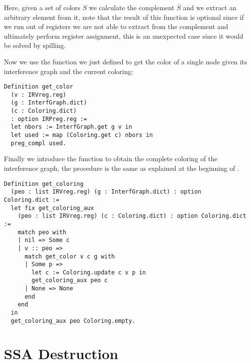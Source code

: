 Here, given a set of colors $S$ we calculate the complement $\bar S$ and we extract an arbitrary element from it, note that the result of this function is optional since if we run out of registers we are not able to extract from the complement and ultimately perform register assignment, this is an unexpected case since it would be solved by spilling.

Now we use the function we just defined to get the color of a single node given its interference graph and the current coloring:

\begin{lstlisting}[style=Coq]
Definition get_color
  (v : IRVreg.reg)
  (g : InterfGraph.dict)
  (c : Coloring.dict)
  : option IRPreg.reg :=
  let nbors := InterfGraph.get g v in
  let used := map (Coloring.get c) nbors in
  preg_compl used.
\end{lstlisting}

Finally we introduce the function to obtain the complete coloring of the interference graph, the procedure is the same as explained at the beginning of .

\begin{lstlisting}[style=Coq]
Definition get_coloring
  (peo : list IRVreg.reg) (g : InterfGraph.dict) : option Coloring.dict :=
  let fix get_coloring_aux
    (peo : list IRVreg.reg) (c : Coloring.dict) : option Coloring.dict :=
    match peo with
    | nil => Some c
    | v :: peo =>
      match get_color v c g with
      | Some p =>
        let c := Coloring.update c v p in
        get_coloring_aux peo c
      | None => None
      end
    end
  in
  get_coloring_aux peo Coloring.empty.
\end{lstlisting}

\section{SSA Destruction}
\label{sec:destruct}

